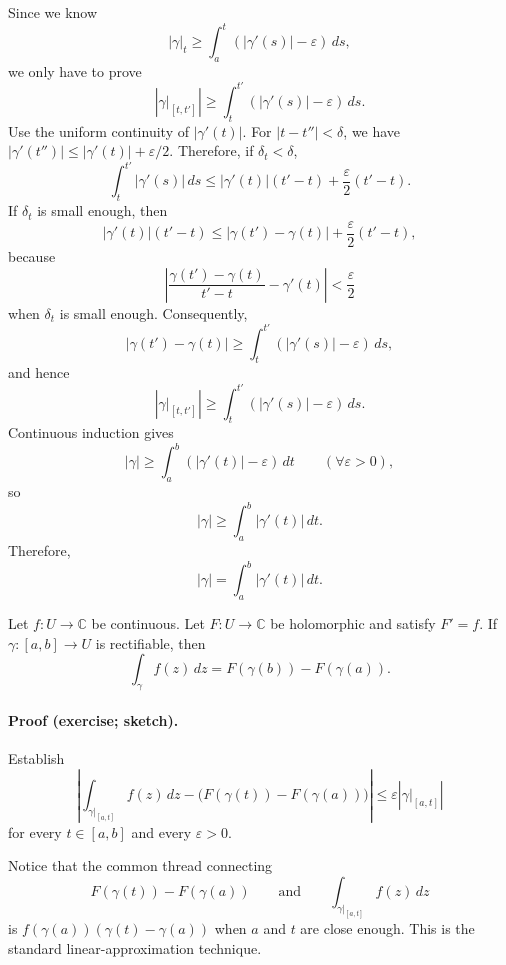 \documentclass[11pt,a4paper]{article}
\begin{document}
Since we know
\[
|\gamma|_t\geq\int_a^t(|\gamma'(s)|-\varepsilon)\,ds,
\]
we only have to prove
\[
\left|\gamma\big|_{[t,t']}\right|
\geq\int_t^{t'}(|\gamma'(s)|-\varepsilon)\,ds.
\]
Use the uniform continuity of $|\gamma'(t)|$. For $|t-t''|<\delta$, we have \(|\gamma'(t'')|\leq|\gamma'(t)|+\varepsilon/2.\)
Therefore, if $\delta_t<\delta$,
\[
\int_t^{t'}|\gamma'(s)|\,ds
\leq|\gamma'(t)|(t'-t)+\frac\varepsilon2(t'-t).
\]
If $\delta_t$ is small enough, then
\[
|\gamma'(t)|(t'-t)
\leq|\gamma(t')-\gamma(t)|+\frac\varepsilon2(t'-t),
\]
because
\[
\left|\frac{\gamma(t')-\gamma(t)}{t'-t}-\gamma'(t)\right|
<\frac\varepsilon2
\]
when $\delta_t$ is small enough. Consequently,
\[
|\gamma(t')-\gamma(t)|
\geq\int_t^{t'}(|\gamma'(s)|-\varepsilon)\,ds,
\]
and hence
\[
\left|\gamma\big|_{[t,t']}\right|
\geq\int_t^{t'}(|\gamma'(s)|-\varepsilon)\,ds.
\]
Continuous induction gives
\[
|\gamma|\geq\int_a^b(|\gamma'(t)|-\varepsilon)\,dt
\qquad(\forall\varepsilon>0),
\]
so
\[
|\gamma|\geq\int_a^b|\gamma'(t)|\,dt.
\]
Therefore,
\[
|\gamma|=\int_a^b|\gamma'(t)|\,dt.
\]

Let $f\colon U\to\mathbb C$ be continuous. Let $F\colon U\to\mathbb C$ be holomorphic and satisfy $F'=f$. If $\gamma\colon[a,b]\to U$ is rectifiable, then
\[
\int_\gamma f(z)\,dz
=F(\gamma(b))-F(\gamma(a)).
\]


\paragraph{Proof (exercise; sketch).}
Establish
\[
\left|
\int_{\gamma|_{[a,t]}}f(z)\,dz
-\bigl(F(\gamma(t))-F(\gamma(a))\bigr)
\right|
\leq\varepsilon\left|\gamma\big|_{[a,t]}\right|
\]
for every $t\in[a,b]$ and every $\varepsilon>0$.

Notice that the common thread connecting
\[
F(\gamma(t))-F(\gamma(a))
\qquad\text{and}\qquad
\int_{\gamma|_{[a,t]}}f(z)\,dz
\]
is \(f(\gamma(a))(\gamma(t)-\gamma(a))\)
when $a$ and $t$ are close enough. This is the standard linear-approximation technique.
\end{document}
